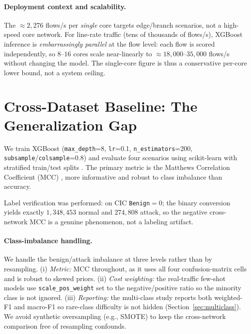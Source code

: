 \documentclass[preprint,12pt,authoryear]{elsarticle}
\begin{document}
\paragraph{Deployment context and scalability.} The $\approx 2{,}276$ flows/s per
\emph{single} core targets edge/branch scenarios, not a high-speed core network.
For line-rate traffic (tens of thousands of flows/s), XGBoost inference is
\emph{embarrassingly parallel} at the flow level: each flow is scored
independently, so $8$--$16$ cores scale near-linearly to
$\approx 18{,}000$--$35{,}000$ flows/s without changing the model. The single-core
figure is thus a conservative per-core lower bound, not a system ceiling.

\section{Cross-Dataset Baseline: The Generalization Gap}
\label{sec:baseline}

We train XGBoost (\texttt{max\_depth}=8, \texttt{lr}=0.1,
\texttt{n\_estimators}=200, \texttt{subsample}/\texttt{colsample}=0.8) and evaluate
four scenarios using scikit-learn \citep{sklearn} with stratified train/test
splits \citep{kohavi}. The primary metric is the Matthews Correlation Coefficient
(MCC) \citep{matthews,chicco}, more informative and robust to class imbalance than
accuracy.

Label verification was performed: on CIC \texttt{Benign}$=0$; the binary
conversion yields exactly $1{,}348{,}453$ normal and $274{,}808$ attack, so the
negative cross-network MCC is a genuine phenomenon, not a labeling artifact.

\paragraph{Class-imbalance handling.} We handle the benign/attack imbalance at three
levels rather than by resampling. (i) \emph{Metric:} MCC throughout, as it uses all
four confusion-matrix cells and is robust to skewed priors. (ii) \emph{Cost
weighting:} the real-traffic few-shot models use \texttt{scale\_pos\_weight} set to
the negative/positive ratio so the minority class is not ignored. (iii)
\emph{Reporting:} the multi-class study reports both weighted-F1 and macro-F1 so
rare-class difficulty is not hidden (Section~\ref{sec:multiclass}). We avoid
synthetic oversampling (e.g., SMOTE) to keep the cross-network comparison free of
resampling confounds.
\end{document}
